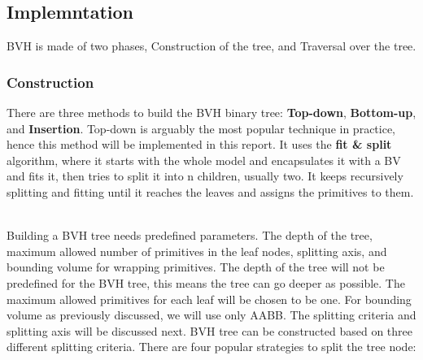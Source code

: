 \documentclass[11pt,a4paper]{article}
\begin{document}
\subsection{Implemntation}
BVH is made of two phases, Construction of the tree, and Traversal over the tree.  

\subsubsection{Construction}
There are three methods to build the BVH binary tree: \textbf{Top-down}, \textbf{Bottom-up}, and \textbf{Insertion}. Top-down is arguably the most popular technique in practice, hence this method will be implemented in this report. It uses the \textbf{fit \& split} algorithm, where it starts with the whole model and encapsulates it with a BV and fits it, then tries to split it
into n children, usually two. It keeps recursively splitting and fitting until it reaches the leaves and assigns the primitives to them.

\noindent
\\
Building a BVH tree needs predefined parameters. The depth of the tree, maximum allowed number of primitives in the leaf nodes, splitting axis, and bounding volume for wrapping primitives. The depth of the tree will not be predefined for the BVH tree, this means the tree can go deeper as possible. The maximum allowed primitives for each leaf will be chosen to be one. For bounding volume as previously discussed, we will use only AABB. The splitting criteria and splitting axis will be discussed next.  
BVH tree can be constructed based on three different splitting criteria. There are four popular strategies to split the tree node:
\end{document}
